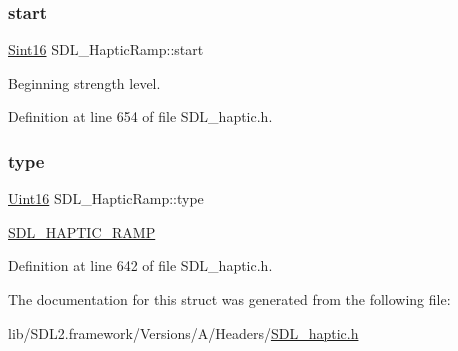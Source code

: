 \subsubsection{\texorpdfstring{start}{start}}
{\footnotesize\ttfamily \mbox{\hyperlink{_s_d_l__stdinc_8h_a9d0257032c0e146ab6121bf0122712f5}{Sint16}} S\+D\+L\+\_\+\+Haptic\+Ramp\+::start}

Beginning strength level. 

Definition at line 654 of file S\+D\+L\+\_\+haptic.\+h.

\mbox{\label{struct_s_d_l___haptic_ramp_aca1c2349372433822ab62f60976640aa}} 
\subsubsection{\texorpdfstring{type}{type}}
{\footnotesize\ttfamily \mbox{\hyperlink{_s_d_l__stdinc_8h_a31fcc0a076c9068668173ee26d33e42b}{Uint16}} S\+D\+L\+\_\+\+Haptic\+Ramp\+::type}

\mbox{\hyperlink{_s_d_l__haptic_8h_af10eb937a64a8f602e9c46682ac0d868}{S\+D\+L\+\_\+\+H\+A\+P\+T\+I\+C\+\_\+\+R\+A\+MP}} 

Definition at line 642 of file S\+D\+L\+\_\+haptic.\+h.



The documentation for this struct was generated from the following file\+:\begin{DoxyCompactItemize}
\item 
lib/\+S\+D\+L2.\+framework/\+Versions/\+A/\+Headers/\mbox{\hyperlink{_s_d_l__haptic_8h}{S\+D\+L\+\_\+haptic.\+h}}\end{DoxyCompactItemize}
